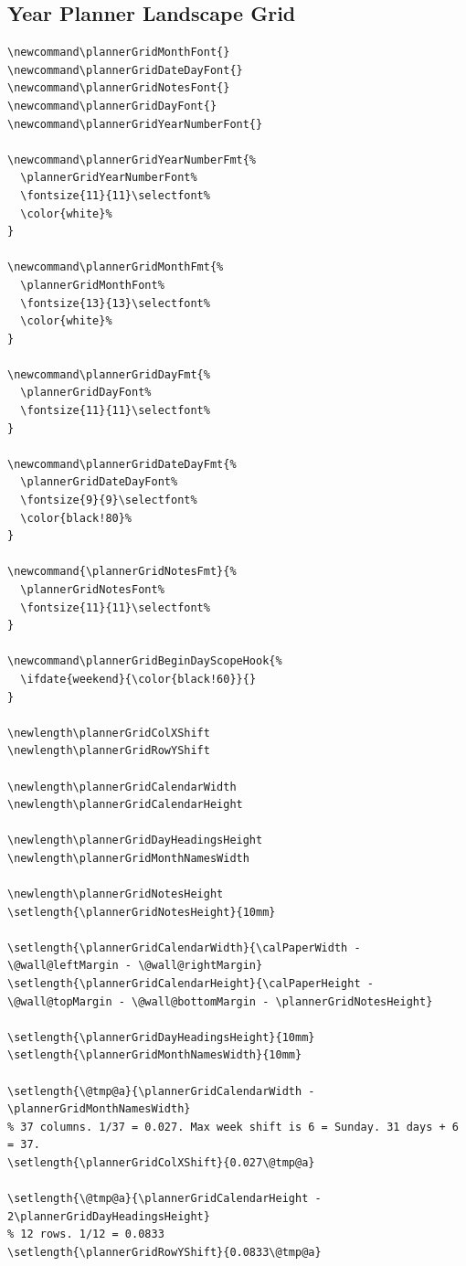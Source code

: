 \documentclass[11pt,oneside]{memoir-article}
\begin{document}
\subsection{Year Planner Landscape Grid}
\label{sec:org0506746}

\begin{verbatim}
\newcommand\plannerGridMonthFont{}
\newcommand\plannerGridDateDayFont{}
\newcommand\plannerGridNotesFont{}
\newcommand\plannerGridDayFont{}
\newcommand\plannerGridYearNumberFont{}

\newcommand\plannerGridYearNumberFmt{%
  \plannerGridYearNumberFont%
  \fontsize{11}{11}\selectfont%
  \color{white}%
}

\newcommand\plannerGridMonthFmt{%
  \plannerGridMonthFont%
  \fontsize{13}{13}\selectfont%
  \color{white}%
}

\newcommand\plannerGridDayFmt{%
  \plannerGridDayFont%
  \fontsize{11}{11}\selectfont%
}

\newcommand\plannerGridDateDayFmt{%
  \plannerGridDateDayFont%
  \fontsize{9}{9}\selectfont%
  \color{black!80}%
}

\newcommand{\plannerGridNotesFmt}{%
  \plannerGridNotesFont%
  \fontsize{11}{11}\selectfont%
}

\newcommand\plannerGridBeginDayScopeHook{%
  \ifdate{weekend}{\color{black!60}}{}
}

\newlength\plannerGridColXShift
\newlength\plannerGridRowYShift

\newlength\plannerGridCalendarWidth
\newlength\plannerGridCalendarHeight

\newlength\plannerGridDayHeadingsHeight
\newlength\plannerGridMonthNamesWidth

\newlength\plannerGridNotesHeight
\setlength{\plannerGridNotesHeight}{10mm}

\setlength{\plannerGridCalendarWidth}{\calPaperWidth - \@wall@leftMargin - \@wall@rightMargin}
\setlength{\plannerGridCalendarHeight}{\calPaperHeight - \@wall@topMargin - \@wall@bottomMargin - \plannerGridNotesHeight}

\setlength{\plannerGridDayHeadingsHeight}{10mm}
\setlength{\plannerGridMonthNamesWidth}{10mm}

\setlength{\@tmp@a}{\plannerGridCalendarWidth - \plannerGridMonthNamesWidth}
% 37 columns. 1/37 = 0.027. Max week shift is 6 = Sunday. 31 days + 6 = 37.
\setlength{\plannerGridColXShift}{0.027\@tmp@a}

\setlength{\@tmp@a}{\plannerGridCalendarHeight - 2\plannerGridDayHeadingsHeight}
% 12 rows. 1/12 = 0.0833
\setlength{\plannerGridRowYShift}{0.0833\@tmp@a}


\end{verbatim}
\end{document}
